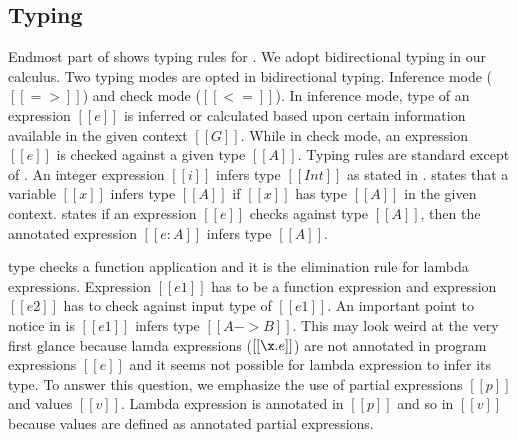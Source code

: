 \subsection{Typing}
\label{sec:union:typ}
Endmost part of  shows typing rules for \cal.
We adopt bidirectional typing in our calculus.
Two typing modes are opted in bidirectional typing. Inference mode ($[[=>]]$) and check mode ($[[<=]]$).
In inference mode, type of an expression $[[e]]$ is inferred or calculated based upon certain information
available in the given context $[[G]]$.
While in check mode, an expression $[[e]]$ is checked against a given type $[[A]]$.
Typing rules are standard except of .
An integer expression $[[i]]$ infers type $[[Int]]$ as stated in .
 states that a variable $[[x]]$ infers type $[[A]]$ if $[[x]]$ has type $[[A]]$ in the
given context.  states if an expression $[[e]]$ checks against type $[[A]]$, then the
annotated expression $[[e:A]]$ infers type $[[A]]$.

 type checks a function application and it is the elimination rule for lambda expressions.
Expression $[[e1]]$
has to be a function expression and expression $[[e2]]$ has to check against input type of $[[e1]]$.
An important point to notice in  is $[[e1]]$ infers type $[[A -> B]]$. This may look weird
at the very first glance because lamda expressions ($[[\x.e]]$) are not annotated in program expressions
$[[e]]$ and it seems not possible for lambda expression to infer its type.
To answer this question, we emphasize the use of partial expressions $[[p]]$ and values $[[v]]$.
Lambda expression is annotated in $[[p]]$ and so in $[[v]]$ because values are defined as annotated
partial expressions.

